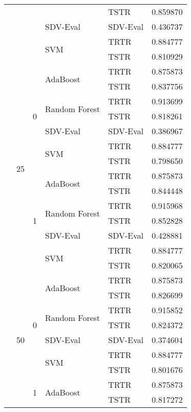\begin{longtable}{lllllr}
 &  &  &  & TSTR & 0.859870 \\
\cline{4-6}
 &  &  & SDV-Eval & SDV-Eval & 0.436737 \\
\cline{4-6}
 &  &  & \multirow[t]{2}{*}{SVM} & TRTR & 0.884777 \\
 &  &  &  & TSTR & 0.810929 \\
\cline{2-6} \cline{3-6} \cline{4-6}
 & \multirow[t]{14}{*}{25} & \multirow[t]{7}{*}{0} & \multirow[t]{2}{*}{AdaBoost} & TRTR & 0.875873 \\
 &  &  &  & TSTR & 0.837756 \\
\cline{4-6}
 &  &  & \multirow[t]{2}{*}{Random Forest} & TRTR & 0.913699 \\
 &  &  &  & TSTR & 0.818261 \\
\cline{4-6}
 &  &  & SDV-Eval & SDV-Eval & 0.386967 \\
\cline{4-6}
 &  &  & \multirow[t]{2}{*}{SVM} & TRTR & 0.884777 \\
 &  &  &  & TSTR & 0.798650 \\
\cline{3-6} \cline{4-6}
 &  & \multirow[t]{7}{*}{1} & \multirow[t]{2}{*}{AdaBoost} & TRTR & 0.875873 \\
 &  &  &  & TSTR & 0.844448 \\
\cline{4-6}
 &  &  & \multirow[t]{2}{*}{Random Forest} & TRTR & 0.915968 \\
 &  &  &  & TSTR & 0.852828 \\
\cline{4-6}
 &  &  & SDV-Eval & SDV-Eval & 0.428881 \\
\cline{4-6}
 &  &  & \multirow[t]{2}{*}{SVM} & TRTR & 0.884777 \\
 &  &  &  & TSTR & 0.820065 \\
\cline{2-6} \cline{3-6} \cline{4-6}
 & \multirow[t]{14}{*}{50} & \multirow[t]{7}{*}{0} & \multirow[t]{2}{*}{AdaBoost} & TRTR & 0.875873 \\
 &  &  &  & TSTR & 0.826699 \\
\cline{4-6}
 &  &  & \multirow[t]{2}{*}{Random Forest} & TRTR & 0.915852 \\
 &  &  &  & TSTR & 0.824372 \\
\cline{4-6}
 &  &  & SDV-Eval & SDV-Eval & 0.374604 \\
\cline{4-6}
 &  &  & \multirow[t]{2}{*}{SVM} & TRTR & 0.884777 \\
 &  &  &  & TSTR & 0.801676 \\
\cline{3-6} \cline{4-6}
 &  & \multirow[t]{7}{*}{1} & \multirow[t]{2}{*}{AdaBoost} & TRTR & 0.875873 \\
 &  &  &  & TSTR & 0.817272 \\

\end{longtable}
